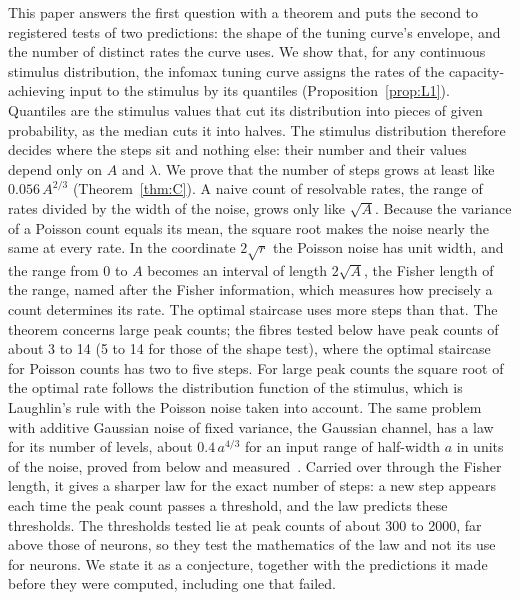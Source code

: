 This paper answers the first question with a theorem and puts the second to registered tests of two predictions: the shape of the
tuning curve's envelope, and the number of distinct rates the curve uses. We show that, for any continuous
stimulus distribution, the infomax tuning curve assigns the rates of the capacity-achieving input to the stimulus by its quantiles
(Proposition~\ref{prop:L1}). Quantiles are the stimulus values that cut its distribution into pieces of given probability, as the
median cuts it into halves. The stimulus distribution therefore decides where the steps sit and nothing else: their number and their
values depend only on $A$ and $\lambda$. We prove that the number of steps grows at least like $0.056\,A^{2/3}$
(Theorem~\ref{thm:C}). A naive count of resolvable rates, the range of rates divided by the width of the noise, grows only like
$\sqrt A$. Because the variance of a Poisson count equals its mean, the square root makes the noise nearly the same at every rate. In
the coordinate $2\sqrt{r}$ the Poisson noise has unit width, and the range from $0$ to $A$ becomes an interval of length $2\sqrt A$,
the Fisher length of the range, named after the Fisher information, which measures how precisely a count determines its rate. The optimal staircase uses more steps than that. The theorem concerns large peak counts; the fibres
tested below have peak counts of about 3 to 14 (5 to 14 for those of the shape test), where the optimal staircase for Poisson
counts has two to five steps. For large peak
counts the square root of the optimal rate follows the distribution function of the stimulus, which is Laughlin's rule with the
Poisson noise taken into account. The same problem with additive
Gaussian noise of fixed variance, the Gaussian channel, has a law for its number of levels, about $0.4\,a^{4/3}$ for an input range
of half-width $a$ in units of the noise, proved from below and measured~\cite{Paper1}. Carried over through the Fisher length, it gives
a sharper law for the exact number of steps: a new step appears each time the peak count passes a threshold, and the law predicts
these thresholds. The thresholds tested lie at peak counts of about 300 to 2000, far above those of neurons, so they test the
mathematics of the law and not its use for neurons. We state it as a conjecture, together with the
predictions it made before they were computed, including one that failed.

